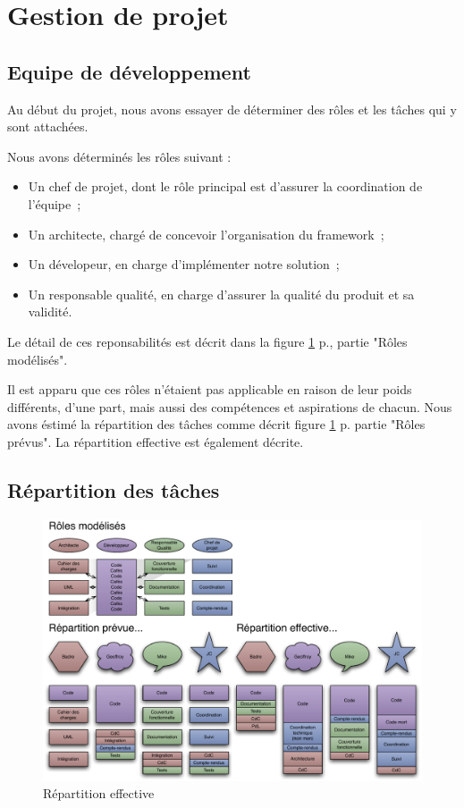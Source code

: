 \section{Gestion de projet}
\subsection{Equipe de développement}
Au début du projet, nous avons essayer de déterminer des rôles et les tâches qui y sont attachées.

Nous avons déterminés les rôles suivant :
\begin{itemize}
 \item Un chef de projet, dont le rôle principal est d'assurer la coordination de l'équipe~;
 \item Un architecte, chargé de concevoir l'organisation du framework~;
 \item Un dévelopeur, en charge d'implémenter notre solution~;
 \item Un responsable qualité, en charge d'assurer la qualité du produit et sa validité.
\end{itemize}
Le détail de ces reponsabilités est décrit dans la figure \ref{fig:repart_effect} p.\pageref{fig:repart_effect}, partie "Rôles modélisés".

Il est apparu que ces rôles n'étaient pas applicable en raison de leur poids différents, d'une part, mais aussi des compétences et aspirations de chacun. Nous avons éstimé la répartition des tâches comme décrit figure \ref{fig:repart_effect} p.\pageref{fig:repart_effect} partie "Rôles prévus".
La répartition effective est également décrite.

\subsection{Répartition des tâches}
\begin{figure}[thbp]
	\centering
		\includegraphics[angle=90, scale=0.7]{../diagrammes/repartition_taches.pdf}
	\caption{Répartition effective}
	\label{fig:repart_effect}
\end{figure}
